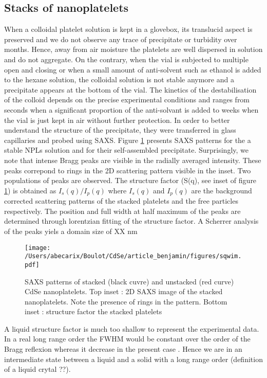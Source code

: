\documentclass[journal = jacsat, manuscript=article, layout = twocolumn]{achemso}
\begin{document}
\subsection{Stacks of nanoplatelets}
When a colloidal platelet solution is kept in a glovebox, its translucid aspect is preserved and we do not observe any trace of precipitate or turbidity over months. Hence, away from air moisture the platelets are well dispersed in solution and do not aggregate. On the contrary, when the vial is subjected to multiple open and closing or when a small amount of anti-solvent such as ethanol is added to the hexane solution, the colloidal solution is not stable anymore and a precipitate appears at the bottom of the vial. The kinetics of the destabilisation of the colloid depends on the precise experimental conditions and ranges from seconds when a significant proportion of the anti-solvant is added to weeks when the vial is just kept in air without further protection. In order to better understand the structure of the precipitate, they were transferred in glass capillaries and probed using SAXS. Figure \ref{stacks} presents SAXS patterns for the a stable NPLs solution and for their self-assembled precipitate. Surprisingly, we note that intense Bragg peaks are visible in the radially averaged intensity. These peaks correpond to rings in the 2D scattering pattern visible in the inset. Two populations of peaks are observed. The structure factor (S(q), see inset of figure \ref{stacks}) is obtained as $I_s(q)/I_p(q)$ where $I_s(q)$ and $I_p(q)$ are the background corrected scattering patterns of the stacked platelets and the free particles respectively. The position and full width at half maximum of the peaks are determined through lorentzian fitting of the structure factor. A Scherrer analysis of the peaks yiels a domain size of XX nm \cite{Smilgies:2009et}


\begin{figure}
\begin{center}
\texttt{[image: /Users/abecarix/Boulot/CdSe/article\_benjamin/figures/sqwim.pdf]}
\caption{\label{stacks} SAXS patterns of stacked (black cuvre) and unstacked (red curve) CdSe nanoplatelets. Top inset : 2D SAXS image of the stacked nanoplatelets. Note the presence of rings in the pattern. Bottom inset : structure factor the stacked platelets}
\end{center}
\end{figure}

A liquid structure factor is much too shallow to represent the experimental data. In a real long range order the FWHM would be constant over the order of the Bragg reflexion whereas it decrease in the present case \cite{guinier_book}. Hence we are in an intermediate state between a liquid and a solid with a long range order (definition of a liquid crytal ??).
\end{document}
